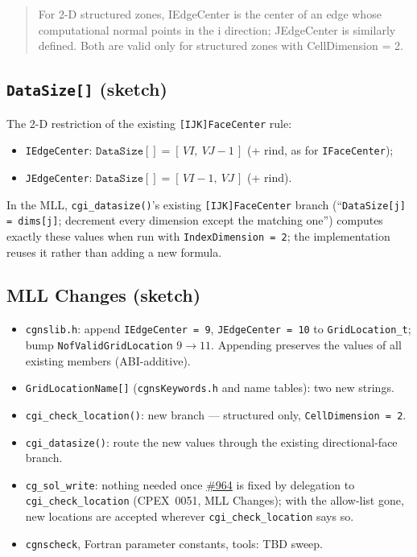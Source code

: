 \documentclass[11pt,letterpaper]{article}
\newenvironment{sidsnew}{%
  \par\noindent
  \begin{quote}\color{cgnsblue!85}\ttfamily\small\bfseries
}{%
  \end{quote}\vspace{0.6em}
}
\begin{document}
\begin{sidsnew}
For 2-D structured zones, IEdgeCenter is the center of an edge whose
computational normal points in the i direction; JEdgeCenter is
similarly defined. Both are valid only for structured zones with
CellDimension = 2.
\end{sidsnew}

\subsection{\texttt{DataSize[]} (sketch)}

The 2-D restriction of the existing \texttt{[IJK]FaceCenter} rule:

\begin{itemize}[leftmargin=2em]
\item \texttt{IEdgeCenter}:
  $\mathtt{DataSize[]} = [\,VI,\ VJ{-}1\,]$ (+ rind, as for
  \texttt{IFaceCenter});
\item \texttt{JEdgeCenter}:
  $\mathtt{DataSize[]} = [\,VI{-}1,\ VJ\,]$ (+ rind).
\end{itemize}

In the MLL, \texttt{cgi\_datasize()}'s existing
\texttt{[IJK]FaceCenter} branch (``\texttt{DataSize[j] = dims[j]};
decrement every dimension except the matching one'') computes exactly
these values when run with \texttt{IndexDimension~=~2}; the
implementation reuses it rather than adding a new formula.

\subsection{MLL Changes (sketch)}

\begin{itemize}[leftmargin=2em]
\item \texttt{cgnslib.h}: append \texttt{IEdgeCenter~=~9},
  \texttt{JEdgeCenter~=~10} to \texttt{GridLocation\_t}; bump
  \texttt{NofValidGridLocation} $9 \rightarrow 11$. Appending preserves
  the values of all existing members (ABI-additive).
\item \texttt{GridLocationName[]} (\texttt{cgnsKeywords.h} and name
  tables): two new strings.
\item \texttt{cgi\_check\_location()}: new branch --- structured only,
  \texttt{CellDimension~=~2}.
\item \texttt{cgi\_datasize()}: route the new values through the
  existing directional-face branch.
\item \texttt{cg\_sol\_write}: nothing needed once
  \href{https://github.com/CGNS/CGNS/issues/964}{\#964} is fixed by
  delegation to \texttt{cgi\_check\_location} (CPEX~0051, MLL
  Changes); with the allow-list gone, new locations are accepted
  wherever \texttt{cgi\_check\_location} says so.
\item \texttt{cgnscheck}, Fortran parameter constants, tools: TBD sweep.
\end{itemize}
\end{document}
